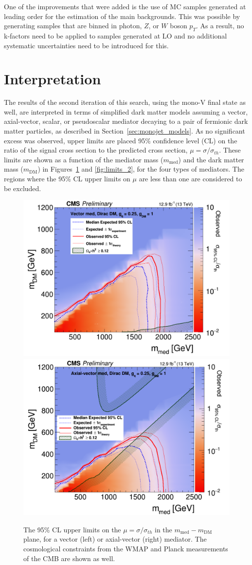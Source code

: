 One of the improvements that were added is the use of MC samples generated at leading order for the estimation of the main backgrounds. This was possible by generating samples that are binned in photon, $Z$, or $W$ boson $p_T$. As a result, no k-factors need to be applied to samples generated at LO and no additional systematic uncertainties need to be introduced for this.

\section{Interpretation}
\label{sec:interpretation}

The results of the second iteration of this search, using the mono-V final state as well, are interpreted in terms of simplified dark matter models assuming a vector, axial-vector, scalar, or pseudoscalar mediator decaying to a pair of fermionic dark matter particles, as described in Section~\ref{sec:monojet_models}. As no significant excess was observed, upper limits are placed  95\% confidence level (CL) on the ratio of the signal cross section to the predicted cross section, $\mu = \sigma/\sigma_{th}$. These limits are shown as a function of the mediator mass ($m_{\mathrm{med}}$) and the dark matter mass ($m_{\mathrm{DM}}$) in Figures~\ref{fig:limits_1} and \ref{fig:limits_2}, for the four types of mediators. The regions where the 95\% CL upper limits on $\mu$ are less than one are considered to be excluded.


\begin{figure}[ht]
  \centering
 \includegraphics[width=.49\textwidth]{vectormed.png} 
 \includegraphics[width=.49\textwidth]{axialmed.png} 
 \caption{The 95\% CL upper limits on the $\mu =  \sigma/\sigma_{th}$ in the  $m_{\mathrm{med}}-m_{\mathrm{DM}}$ plane, for a vector (left) or axial-vector (right) mediator. The cosmological constraints from the WMAP and Planck measurements of the \ac{CMB} are shown as well.}
 \label{fig:limits_1}
\end{figure}

